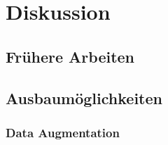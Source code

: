 \section{Diskussion}
\subsection{Frühere Arbeiten}
\subsection{Ausbaumöglichkeiten}
\subsubsection{Data Augmentation}